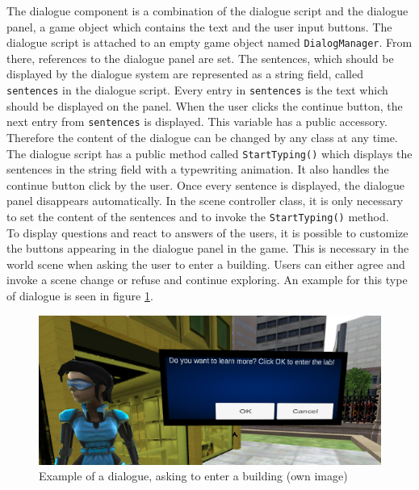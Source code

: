 The dialogue component is a combination of the dialogue script and the dialogue panel, a game object which contains the text and the user input buttons. The dialogue script is attached to an empty game object named \texttt{DialogManager}. From there, references to the dialogue panel are set. The sentences, which should be displayed by the dialogue system are represented as a string field, called \texttt{sentences} in the dialogue script. Every entry in \texttt{sentences} is the text which should be displayed on the panel. When the user clicks the continue button, the next entry from \texttt{sentences} is displayed. This variable has a public accessory. Therefore the content of the dialogue can be changed by any class at any time. \\
The dialogue script has a public method called \texttt{StartTyping()} which displays the sentences in the string field with a typewriting animation. It also handles the continue button click by the user. Once every sentence is displayed, the dialogue panel disappears automatically. In the scene controller class, it is only necessary to set the content of the sentences and to invoke the \texttt{StartTyping()} method.\\
To display questions and react to answers of the users, it is possible to customize the buttons appearing in the dialogue panel in the game. This is necessary in the world scene when asking the user to enter a building. Users can either agree and invoke a scene change or refuse and continue exploring. An example for this type of dialogue is seen in figure \ref{fig:question-dialog}.
\begin{figure}[h]
  \includegraphics[width=14cm]{kapitel/software-dialog-question.PNG}
  \centering
  \caption{Example of a dialogue, asking to enter a building (own image)}
  \label{fig:question-dialog}
\end{figure}
